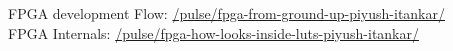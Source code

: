 
\reversemarginpar {}
\noindent
\textcolor{ultramarine}{FPGA development Flow:} \href{https://www.linkedin.com/pulse/fpga-from-ground-up-piyush-itankar/}{\faLinkedinSquare /pulse/fpga-from-ground-up-piyush-itankar/}
\\
\textcolor{ultramarine}{FPGA Internals:} \href{https://www.linkedin.com/pulse/fpga-how-looks-inside-luts-piyush-itankar/}{\faLinkedinSquare /pulse/fpga-how-looks-inside-luts-piyush-itankar/}
\\

